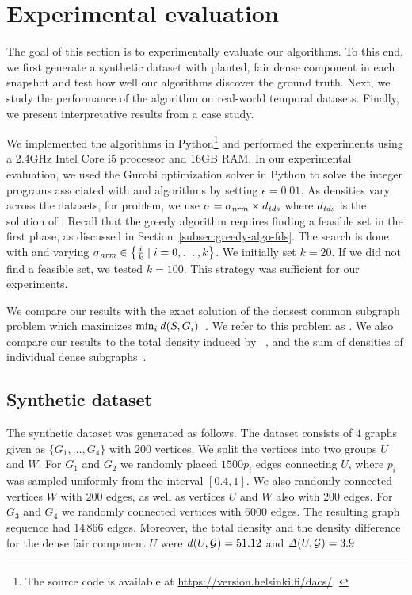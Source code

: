 \section{Experimental evaluation}\label{sec:exp}


The goal of this section is to experimentally evaluate our algorithms. To this end, we first generate a synthetic dataset with planted, fair dense component in each snapshot and test how well our algorithms discover the ground truth.
Next, we study the performance of the algorithm on real-world temporal datasets.
Finally, we present interpretative results from a case study.

We implemented the algorithms in Python\footnote{The source code is available at \url{https://version.helsinki.fi/dacs/}.
\label{foot:code}} and performed the experiments using a 2.4GHz Intel Core i5 processor and 16GB RAM. In our experimental evaluation, we used the Gurobi optimization solver in Python to solve the integer programs associated with \algipcm and \algipdiff algorithms by setting $\epsilon = 0.01$. As densities vary across the datasets,
for \problemcdcsdiff problem, we use $\sigma = \sigma_{\mathit{nrm}} \times d_{\mathit{tds}}$ where $d_{\mathit{tds}}$ is the solution of \problemdts.
Recall that the greedy algorithm \alggrdfms requires finding a feasible set in the first phase, as discussed in Section~\ref{subsec:greedy-algo-fds}. The search is done with \alggrd and varying $\sigma_{\mathit{nrm}} \in \left\{\frac{i}{k} \mid i = 0, \ldots, k\right\}$.
We initially set $k = 20$. If we did not find a feasible set, we tested $k = 100$. This strategy was sufficient for our experiments.

We compare our results with the exact solution of the densest common subgraph problem which maximizes $\min_i \dens{S, G_i}$~\cite{jethava2015finding}. We refer to this problem as \problemdcs.
We also compare our results to the total density induced by \problemdts~\cite{semertzidis2019finding}, and the sum of densities of individual dense subgraphs~\cite{goldberg1984finding}.

\subsection{Synthetic dataset}
The synthetic dataset was generated as follows.
The dataset consists of $4$ graphs given as $\{G_1,\ldots,G_4\}$ with $200$ vertices. We split the vertices into two groups $U$ and $W$.
For $G_1$ and $G_2$ we randomly placed $1500 p_i$ edges connecting $U$, where $p_i$ was sampled uniformly from the interval $[0.4, 1]$. We also randomly connected vertices $W$ with $200$ edges, as well as vertices $U$ and $W$ also with $200$ edges. For $G_3$ and $G_4$ we randomly connected vertices with $6000$ edges.
The resulting graph sequence had $14\,866$ edges. Moreover, the total density and the density difference for the dense fair component $U$ were $\dens{U, \calG} = 51.12$ and $\diff{U, \calG} = 3.9$.


